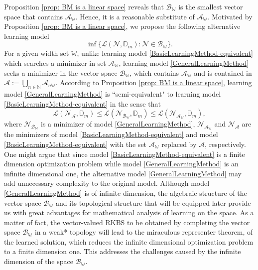 \documentclass[11pt]{article}
\begin{document}
Proposition \ref{prop: BM is a linear space} reveals that $\mathcal{B}_{\mathbb{W}}$ is the smallest vector space that contains $\mathcal{A}_{\mathbb{W}}$. Hence, it is a reasonable substitute of  $\mathcal{A}_{\mathbb{W}}$.
Motivated by Proposition \ref{prop: BM is a linear space}, we propose the following alternative learning model
\begin{equation}\label{GeneralLearningMethod}
    \inf\{\mathcal{L}(\mathcal{N},\mathbb{D}_m): \mathcal{N}\in\mathcal{B}_{\mathbb{W}}\}.
\end{equation}
For a given width set $\mathbb{W}$, unlike learning model \eqref{BasicLearningMethod-equivalent} which searches a minimizer in set $\mathcal{A}_\mathbb{W}$, learning model \eqref{GeneralLearningMethod} seeks a minimizer in the vector space $\mathcal{B}_\mathbb{W}$, which contains  $\mathcal{A}_\mathbb{W}$ and is contained in $\mathcal{A}:=\bigcup_{n\in\mathbb{N}}\mathcal{A}_{n\mathbb{W}}$. 
According to Proposition \ref{prop: BM is a linear space}, learning model \eqref{GeneralLearningMethod} is ``semi-equivalent" to learning model \eqref{BasicLearningMethod-equivalent} in the sense that 
\begin{equation}\label{Comparison-of-three-models}
    \mathcal{L}(\mathcal{N}_{\mathcal{A}},\mathbb{D}_m)\leq \mathcal{L}(\mathcal{N}_{\mathcal{B}_{\mathbb{W}}},\mathbb{D}_m)\leq \mathcal{L}(\mathcal{N}_{\mathcal{A}_{\mathbb{W}}},\mathbb{D}_m),
\end{equation}
where $\mathcal{N}_{\mathcal{B}_{\mathbb{W}}}$ is a minimizer of  model \eqref{GeneralLearningMethod}, $\mathcal{N}_{\mathcal{A}_{\mathbb{W}}}$ and $\mathcal{N}_{\mathcal{A}}$ are the minimizers of model \eqref{BasicLearningMethod-equivalent} and model \eqref{BasicLearningMethod-equivalent} with the set $\mathcal{A}_{\mathbb{W}}$ replaced by $\mathcal{A}$, respectively. One might argue that since model \eqref{BasicLearningMethod-equivalent} is a finite dimension optimization problem while model \eqref{GeneralLearningMethod} is an infinite dimensional one, the alternative model  \eqref{GeneralLearningMethod} may add unnecessary complexity to the original model. Although model \eqref{GeneralLearningMethod} is of infinite dimension, the algebraic structure of the vector space $\mathcal{B}_{\mathbb{W}}$ and its topological structure that will be equipped later provide us with great advantages for mathematical analysis of learning on the space.
As a matter of fact, the vector-valued RKBS to be obtained by completing the vector space $\mathcal{B}_{\mathbb{W}}$ in a weak* topology will lead to the miraculous representer theorem, of the learned solution, which reduces the infinite dimensional optimization problem to a finite dimension one. This addresses the challenges caused by the infinite dimension of the space $\mathcal{B}_{\mathbb{W}}$.
\end{document}
